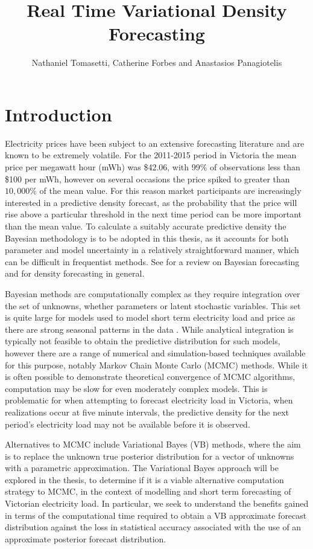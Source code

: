 \documentclass[12pt,a4paper]{article}%
\title{Real Time Variational Density Forecasting}
\author{Nathaniel Tomasetti, Catherine Forbes and Anastasios Panagiotelis}
\numberwithin{equation}{section}
\begin{document}
\maketitle
\tableofcontents
\section{Introduction} \label{sec:Intro}

Electricity prices have been subject to an extensive forecasting literature and are known to be extremely volatile. For the 2011-2015 period in Victoria the mean price per megawatt hour (mWh) was \$42.06, with 99\% of observations less than \$100 per mWh, however on several occasions the price spiked to greater than $10,000\%$ of the mean value. For this reason market participants are increasingly interested in a predictive density forecast, as the probability that the price will rise above a particular threshold in the next time period can be more important than the mean value. To calculate a suitably accurate predictive density the Bayesian methodology is to be adopted in this thesis, as it accounts for both parameter and model uncertainty in a relatively straightforward manner, which can be difficult in frequentist methods. See \citet{Geweke2006} for a review on Bayesian forecasting and \citet{Gneiting2014} for density forecasting in general. 

Bayesian methods are computationally complex as they require integration over the set of unknowns, whether parameters or latent stochastic variables. This set is quite large for models used to model short term electricity load and price as there are strong seasonal patterns in the data \citep{Taylor2003}. While analytical integration is typically not feasible to obtain the predictive distribution for such models, however there are a range of numerical and simulation-based techniques available for this purpose, notably Markov Chain Monte Carlo (MCMC) methods. While it is often possible to demonstrate theoretical convergence of MCMC algorithms, computation may be slow for even moderately complex models. This is problematic for when attempting to forecast electricity load in Victoria, when realizations occur at five minute intervals, the predictive density for the next period's electricity load may not be available before it is observed.

Alternatives to MCMC include Variational Bayes (VB) methods, where the aim is to replace the unknown true posterior distribution for a vector of unknowns with a parametric approximation. The Variational Bayes approach will be explored in the thesis, to determine if it is a viable alternative computation strategy to MCMC, in the context of modelling and short term forecasting of Victorian electricity load. In particular, we seek to understand the benefits gained in terms of the computational time required to obtain a VB approximate forecast distribution against the loss in statistical accuracy associated with the use of an approximate posterior forecast distribution. 
\end{document}
